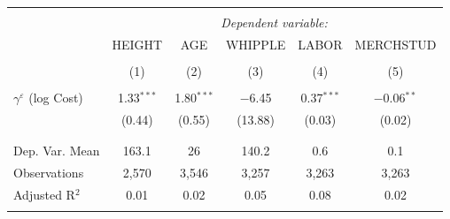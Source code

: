 
\begin{tabular}{@{\extracolsep{5pt}}lccccc} 
\\[-1.8ex]\hline 
\hline \\[-1.8ex] 
 & \multicolumn{5}{c}{\textit{Dependent variable:}} \\ 
\cline{2-6} 
 & HEIGHT & AGE & WHIPPLE & LABOR & MERCHSTUD \\ 
\\[-1.8ex] & (1) & (2) & (3) & (4) & (5)\\ 
\hline \\[-1.8ex] 
 $\gamma^{\varepsilon}$ (log Cost) & 1.33$^{***}$ & 1.80$^{***}$ & $-$6.45 & 0.37$^{***}$ & $-$0.06$^{**}$ \\ 
  & (0.44) & (0.55) & (13.88) & (0.03) & (0.02) \\ 
  & & & & & \\ 
\hline \\[-1.8ex] 
Dep. Var. Mean & 163.1 & 26 & 140.2 & 0.6 & 0.1 \\ 
Observations & 2,570 & 3,546 & 3,257 & 3,263 & 3,263 \\ 
Adjusted R$^{2}$ & 0.01 & 0.02 & 0.05 & 0.08 & 0.02 \\ 
\hline 
\hline \\[-1.8ex] 
\end{tabular} 
